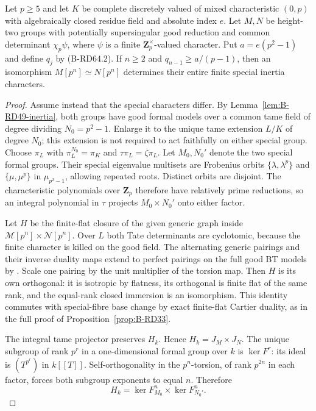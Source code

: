 \begin{proposition}
\label{prop:B-RD64-formal}
Let $p\ge5$ and let $K$ be complete discretely valued of mixed
characteristic $(0,p)$ with algebraically closed residue field
and absolute index $e$. Let $M,N$ be height-two groups with
potentially supersingular good reduction and common determinant
$\chi_p\psi$, where $\psi$ is a finite $\mathbf Z_p^\times$-valued character.
Put $a=e(p^2-1)$ and define $q_j$ by (B-RD64.2).
If $n\ge2$ and $q_{n-1}\ge a/(p-1)$, then an isomorphism
$M[p^n]\simeq N[p^n]$ determines their entire finite special
inertia characters.
\end{proposition}
\begin{proof}
Assume instead that the special characters differ. By
Lemma~\ref{lem:B-RD49-inertia}, both groups have good formal
models over a common tame field of degree dividing $N_0=p^2-1$.
Enlarge it to the unique tame extension $L/K$ of degree $N_0$;
this extension is not required to act faithfully on either
special group. Choose $\pi_L$ with $\pi_L^{N_0}=\pi_K$ and
$\tau\pi_L=\zeta\pi_L$.
Let $M_0,N_0'$ denote the two special formal groups.
Their special eigenvalue multisets are Frobenius orbits
$\{\lambda,\lambda^p\}$ and $\{\mu,\mu^p\}$ in
$\mu_{p^2-1}$, allowing repeated roots. Distinct orbits are
disjoint. The characteristic polynomials over $\mathbf Z_p$
therefore have relatively prime reductions, so an integral
polynomial in $\tau$ projects $M_0\times N_0'$ onto either factor.

Let $H$ be the finite-flat closure of the given generic graph
inside $\mathcal M[p^n]\times\mathcal N[p^n]$.
Over $L$ both Tate determinants are cyclotomic, because the finite
character is killed on the good field. The alternating generic pairings
and their inverse duality maps extend to perfect pairings on
the full good BT models by
\cite[Theorem~4 and Corollaries~1--2, p.~181]{Tate1967PDivisible}.
Scale one pairing by the unit multiplier of the torsion map.
Then $H$ is its own orthogonal: it is isotropic by flatness,
its orthogonal is finite flat of the same rank, and the
equal-rank closed immersion is an isomorphism. This identity
commutes with special-fibre base change by exact finite-flat
Cartier duality, as in the full proof of Proposition~\ref{prop:B-RD33}.

The integral tame projector preserves $H_k$. Hence
$H_k=J_M\times J_N$. The unique subgroup of rank $p^r$ in a
one-dimensional formal group over $k$ is $\ker F^r$:
its ideal is $(T^{p^r})$ in $k[[T]]$. Self-orthogonality in
the $p^n$-torsion, of rank $p^{2n}$ in each factor, forces
both subgroup exponents to equal $n$. Therefore
\[
                     H_k=\ker F_{M_0}^n\times
                                  \ker F_{N_0'}^n.      \tag{B-RD64.7}
\]


\end{proof}
